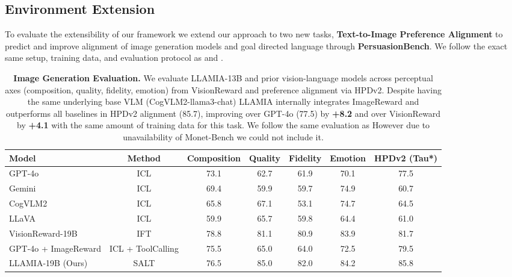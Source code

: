 \documentclass{article}
\newcommand{\valbest}[1]{\colorbox{valbest}{#1}}
\newcommand{\valgood}[1]{\colorbox{valgood}{#1}}
\theoremstyle{plain}
\theoremstyle{definition}
\theoremstyle{remark}
\begin{document}
\subsection{Environment Extension}
To evaluate the extensibility of our framework we extend our approach to two new tasks, \textbf{Text-to-Image Preference Alignment} to predict and improve alignment of image generation models and goal directed language through \textbf{PersuasionBench}. We follow the exact same setup, training data, and evaluation protocol as \cite{xu2025visionrewardfinegrainedmultidimensionalhuman} and \cite{singh2024measuring}.

\begin{table}[h]
    \centering
    \begin{adjustbox}{max width=1.05\textwidth}
    \begin{tabular}{l|c|cccc|c}
    \toprule[1.2pt]
    \textbf{Model} & \textbf{Method} & \textbf{Composition} & \textbf{Quality} & \textbf{Fidelity} & \textbf{Emotion} & \textbf{HPDv2 (Tau*)} \\
    \midrule
    GPT-4o & ICL & 73.1 & 62.7 & 61.9 & 70.1 & 77.5 \\
    Gemini & ICL & 69.4 & 59.9 & 59.7 & 74.9 & 60.7 \\
    CogVLM2 & ICL & 65.8 & 67.1 & 53.1 & 74.7 & 64.5 \\
    LLaVA & ICL & 59.9 & 65.7 & 59.8 & 64.4 & 61.0 \\
    VisionReward-19B & IFT & \valbest{78.8} & \valgood{81.1} & \valgood{80.9} & \valgood{83.9} & \valgood{81.7} \\
    GPT-4o + ImageReward & ICL + ToolCalling & 75.5 & 65.0 & 64.0 & 72.5 & 79.5 \\
    \midrule
    LLAMIA-19B (Ours) & SALT & \valgood{76.5} & \valbest{85.0} & \valbest{82.0} & \valbest{84.2} & \valbest{85.8} \\
    \bottomrule[1.2pt]
    \end{tabular}
    \end{adjustbox}
    \caption{\textbf{Image Generation Evaluation.} We evaluate LLAMIA-13B and prior vision-language models across perceptual axes (composition, quality, fidelity, emotion) from VisionReward \cite{xu2025visionrewardfinegrainedmultidimensionalhuman} and preference alignment via HPDv2\cite{wu2023human}. Despite having the same underlying base VLM (CogVLM2-llama3-chat\cite{hong2024cogvlm2}) LLAMIA internally integrates ImageReward\cite{xu2023imagereward} and outperforms all baselines in HPDv2 alignment (\valbest{85.7}), improving over GPT-4o (\valgood{77.5}) by \textbf{+8.2} and over VisionReward by \textbf{+4.1} with the same amount of training data for this task. We follow the same evaluation as \cite{xu2025visionrewardfinegrainedmultidimensionalhuman} However due to unavailability of Monet-Bench we could not include it.}
    \label{tab:image_generation}
\end{table}
\end{document}
